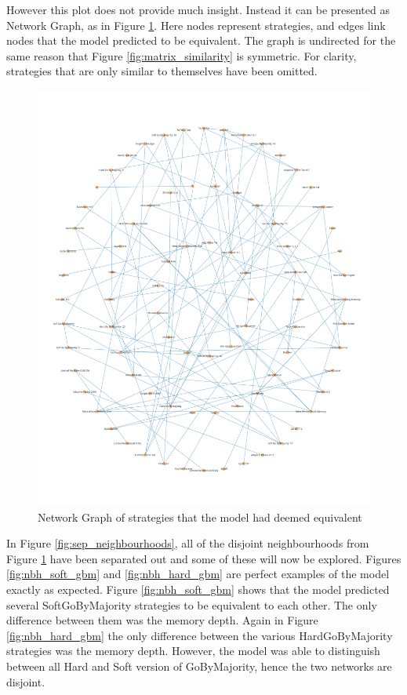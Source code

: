 However this plot does not provide much insight.
Instead it can be presented as Network Graph, as in Figure \ref{fig:overall_neighbourhoods}.
Here nodes represent strategies, and edges link nodes that the model predicted to be equivalent.
The graph is undirected for the same reason that Figure \ref{fig:matrix_similarity} is symmetric.
For clarity, strategies that are only similar to themselves have been omitted.

\begin{figure}[htbp!]
    \centering
    \includegraphics[width=0.8\linewidth]{../img/neighbourhoods/overall.png}
    \caption{Network Graph of strategies that the model had deemed equivalent}
    \label{fig:overall_neighbourhoods}
\end{figure}

In Figure \ref{fig:sep_neighbourhoods}, all of the disjoint neighbourhoods from Figure \ref{fig:overall_neighbourhoods} have been separated out and some of these will now be explored.
Figures \ref{fig:nbh_soft_gbm} and \ref{fig:nbh_hard_gbm} are perfect examples of the model exactly as expected.
Figure \ref{fig:nbh_soft_gbm} shows that the model predicted several SoftGoByMajority strategies to be equivalent to each other.
The only difference between them was the memory depth.
Again in Figure \ref{fig:nbh_hard_gbm} the only difference between the various HardGoByMajority strategies was the memory depth.
However, the model was able to distinguish between all Hard and Soft version of GoByMajority, hence the two networks are disjoint.

